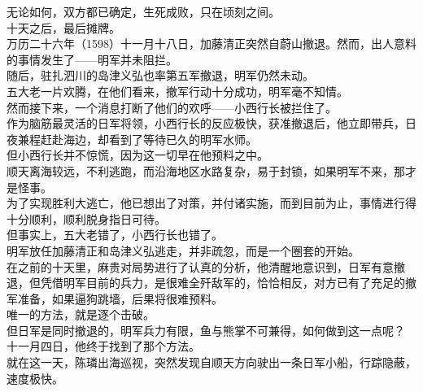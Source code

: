 \begin{multicols}{\theparacolNo}
无论如何，双方都已确定，生死成败，只在顷刻之间。\\

十天之后，最后摊牌。\\

万历二十六年（1598）十一月十八日，加藤清正突然自蔚山撤退。然而，出人意料的事情发生了——明军并未阻拦。\\

随后，驻扎泗川的岛津义弘也率第五军撤退，明军仍然未动。\\

五大老一片欢腾，在他们看来，撤军行动十分成功，明军毫不知情。\\

然而接下来，一个消息打断了他们的欢呼——小西行长被拦住了。\\

作为脑筋最灵活的日军将领，小西行长的反应极快，获准撤退后，他立即带兵，日夜兼程赶赴海边，却看到了等待已久的明军水师。\\

但小西行长并不惊慌，因为这一切早在他预料之中。\\

顺天离海较远，不利逃跑，而沿海地区水路复杂，易于封锁，如果明军不来，那才是怪事。\\

为了实现胜利大逃亡，他已想出了对策，并付诸实施，而到目前为止，事情进行得十分顺利，顺利脱身指日可待。\\

但事实上，五大老错了，小西行长也错了。\\

明军放任加藤清正和岛津义弘逃走，并非疏忽，而是一个圈套的开始。\\

在之前的十天里，麻贵对局势进行了认真的分析，他清醒地意识到，日军有意撤退，但凭借明军目前的兵力，是很难全歼敌军的，恰恰相反，对方已有了充足的撤军准备，如果逼狗跳墙，后果将很难预料。\\

唯一的方法，就是逐个击破。\\

但日军是同时撤退的，明军兵力有限，鱼与熊掌不可兼得，如何做到这一点呢？\\

十一月四日，他终于找到了那个方法。\\

就在这一天，陈璘出海巡视，突然发现自顺天方向驶出一条日军小船，行踪隐蔽，速度极快。\\


\end{multicols}
